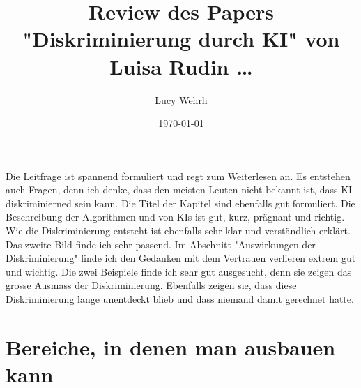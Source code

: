 \documentclass{article}
\title{Review des Papers "Diskriminierung durch KI" von Luisa Rudin \dots}
\author{Lucy Wehrli}
\date{\today}
\begin{document}
\maketitle

\section{}
Die Leitfrage ist spannend formuliert und regt zum Weiterlesen an. Es entstehen auch Fragen, denn ich denke, dass den meisten Leuten nicht bekannt ist, dass KI diskriminierned sein kann. Die Titel der Kapitel sind ebenfalls gut formuliert. Die Beschreibung der Algorithmen und von KIs ist gut, kurz, prägnant und richtig. Wie die Diskriminierung entsteht ist ebenfalls sehr klar und verständlich erklärt. Das zweite Bild finde ich sehr passend. Im Abschnitt "Auswirkungen der Diskriminierung" finde ich den Gedanken mit dem Vertrauen verlieren extrem gut und wichtig. Die zwei Beispiele finde ich sehr gut ausgesucht, denn sie zeigen das grosse Ausmass der Diskriminierung. Ebenfalls zeigen sie, dass diese Diskriminierung lange unentdeckt blieb und dass niemand damit gerechnet hatte. 

\section{Bereiche, in denen man ausbauen kann}

\printbibliography
\end{document}

